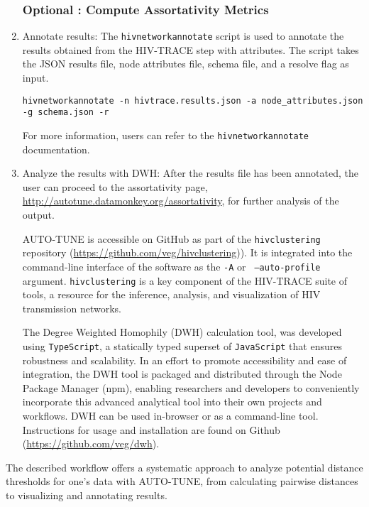 \documentclass[utf8]{FrontiersinHarvard} %
\begin{document}
\begin{enumerate}
	      \subsubsection{Optional : Compute Assortativity Metrics}

	      \item{ Annotate results: The {\tt hivnetworkannotate} script is used to annotate the results obtained from the HIV-TRACE step with attributes. The script takes the JSON results file, node attributes file, schema file, and a resolve flag as input.
	                  \begin{lstlisting}[style=BashInputStyle]
hivnetworkannotate -n hivtrace.results.json -a node_attributes.json -g schema.json -r
	\end{lstlisting}
	                  For more information, users can refer to the {\tt hivnetworkannotate}
	                  documentation. }

	      \item{ Analyze the results with DWH: After the results file has been annotated, the user can proceed to the assortativity page, \url{http://autotune.datamonkey.org/assortativity}, for further analysis of the output. }

	      AUTO-TUNE is  accessible on GitHub as part of the {\tt hivclustering}
	      repository (\url{https://github.com/veg/hivclustering})). It is integrated into
	      the command-line interface of the software as the {\tt -A} or {\tt
			      --auto-profile} argument. {\tt hivclustering} is a key component of the
	      HIV-TRACE suite of tools, a resource for the inference, analysis, and
	      visualization of HIV transmission networks.

	      The Degree Weighted Homophily (DWH) calculation tool, was developed using {\tt TypeScript}, a statically typed
	      superset of {\tt JavaScript} that ensures robustness and scalability. In an
	      effort to promote accessibility and ease of integration, the DWH tool is
	      packaged and distributed through the Node Package Manager (npm), enabling
	      researchers and developers to conveniently incorporate this advanced analytical
	      tool into their own projects and workflows. DWH can be used in-browser or as a
	      command-line tool. Instructions for usage and installation are found on Github
	      (\url{https://github.com/veg/dwh}).

\end{enumerate}

The described workflow offers a systematic approach to analyze potential
distance thresholds for one's data with AUTO-TUNE, from calculating pairwise
distances to visualizing and annotating results.
\end{document}
